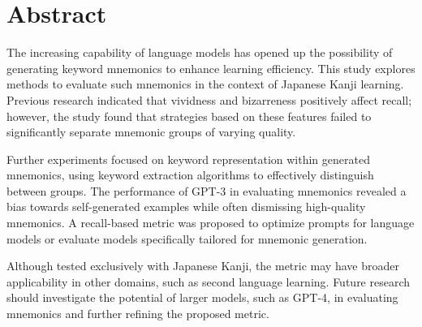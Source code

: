 \section*{Abstract}

The increasing capability of language models has opened up the possibility of generating keyword mnemonics to enhance learning efficiency. This study explores methods to evaluate such mnemonics in the context of Japanese Kanji learning. Previous research indicated that vividness and bizarreness positively affect recall; however, the study found that strategies based on these features failed to significantly separate mnemonic groups of varying quality.

Further experiments focused on keyword representation within generated mnemonics, using keyword extraction algorithms to effectively distinguish between groups. The performance of GPT-3 in evaluating mnemonics revealed a bias towards self-generated examples while often dismissing high-quality mnemonics. A recall-based metric was proposed to optimize prompts for language models or evaluate models specifically tailored for mnemonic generation.

Although tested exclusively with Japanese Kanji, the metric may have broader applicability in other domains, such as second language learning. Future research should investigate the potential of larger models, such as GPT-4, in evaluating mnemonics and further refining the proposed metric.
